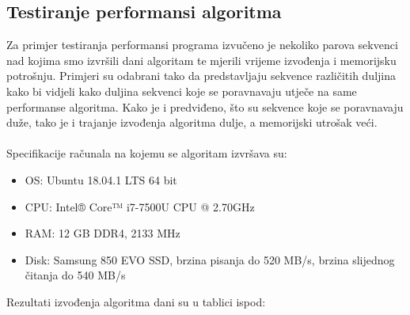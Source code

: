 \documentclass[a4paper]{article}
\begin{document}
\subsection{Testiranje performansi algoritma}
Za primjer testiranja performansi programa izvučeno je nekoliko parova sekvenci nad kojima smo izvršili dani algoritam te mjerili vrijeme izvođenja i memorijsku potrošnju. Primjeri su odabrani tako da predstavljaju sekvence različitih duljina kako bi vidjeli kako duljina sekvenci koje se poravnavaju utječe na same performanse algoritma. Kako je i predviđeno, što su sekvence koje se poravnavaju duže, tako je i trajanje izvođenja algoritma dulje, a memorijski utrošak veći.\\\\
Specifikacije računala na kojemu se algoritam izvršava su:
\begin{itemize}
  \item OS: Ubuntu 18.04.1 LTS 64 bit
  \item CPU: Intel® Core™ i7-7500U CPU @ 2.70GHz
  \item RAM: 12 GB DDR4, 2133 MHz
  \item Disk: Samsung 850 EVO SSD, brzina pisanja do 520 MB/s, brzina slijednog čitanja do 540 MB/s
\end{itemize}
Rezultati izvođenja algoritma dani su u tablici ispod:
\end{document}
